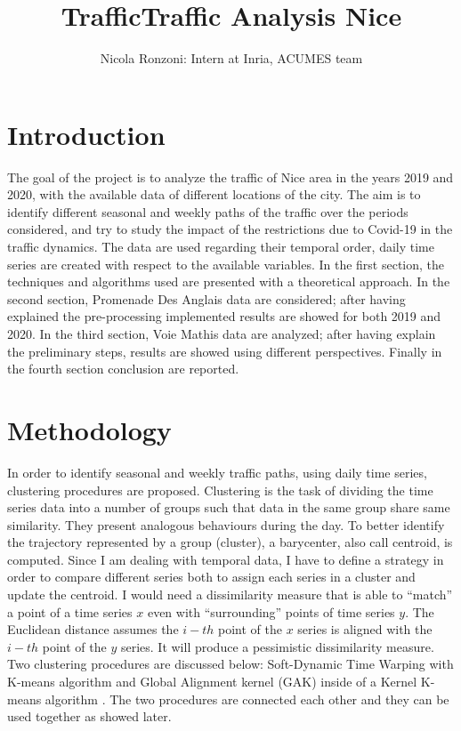 \documentclass[11pt]{article}
\title{Traffic}
\author{Nicola Ronzoni: Intern at Inria, ACUMES team}
\begin{document}
    
    \maketitle
    
    

    
    \title{Traffic Analysis Nice}

    \section{Introduction} \label{Introduction}

    The goal of the project is to analyze the traffic of Nice area in the
years 2019 and 2020, with the available data of different locations of
the city. The aim is to identify different seasonal and weekly paths of
the traffic over the periods considered, and try to study the impact of
the restrictions due to Covid-19 in the traffic dynamics. The data are
used regarding their temporal order, daily time series are created with
respect to the available variables. In the first section, the techniques
and algorithms used are presented with a theoretical approach. In the
second section, Promenade Des Anglais data are considered; after having
explained the pre-processing implemented results are showed for both
2019 and 2020. In the third section, Voie Mathis data are analyzed;
after having explain the preliminary steps, results are showed using
different perspectives. Finally in the fourth section conclusion are
reported.

    \section{Methodology} \label{Methodology}

    In order to identify seasonal and weekly traffic paths, using daily time
series, clustering procedures are proposed. Clustering is the task of
dividing the time series data into a number of groups such that data in
the same group share same similarity. They present analogous behaviours
during the day. To better identify the trajectory represented by a group
(cluster), a barycenter, also call centroid, is computed. Since I am
dealing with temporal data, I have to define a strategy in order to
compare different series both to assign each series in a cluster and
update the centroid. I would need a dissimilarity measure that is able
to ``match'' a point of a time series \(x\) even with ``surrounding''
points of time series \(y\). The Euclidean distance assumes the \(i-th\)
point of the \(x\) series is aligned with the \(i-th\) point of the
\(y\) series. It will produce a pessimistic dissimilarity measure. Two
clustering procedures are discussed below: Soft-Dynamic Time Warping
with K-means algorithm \cite{cuturi2017soft} and Global Alignment kernel
(GAK) inside of a Kernel K-means algorithm \cite{cuturi2011fast}. The
two procedures are connected each other and they can be used together as
showed later.
\end{document}
